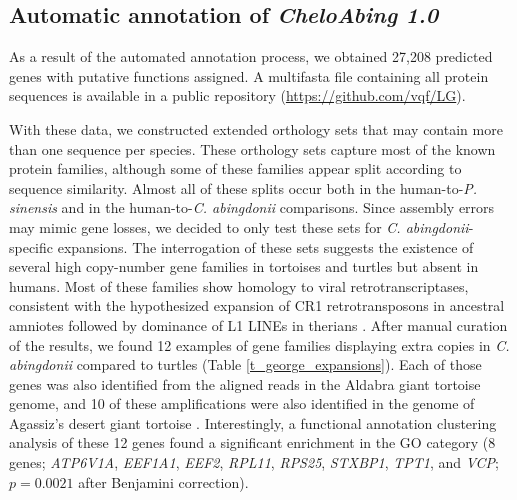 \subsection{Automatic annotation of \emph{CheloAbing 1.0}} \label{ss_results_george_automatic_annotation}

As a result of the automated annotation process, we obtained 27,208 predicted genes with putative functions assigned. 
A multifasta file containing all protein sequences is available in a public repository (\href{https://github.com/vqf/LG}{https://github.com/vqf/LG}).

With these data, we constructed extended orthology sets that may contain more than one sequence per species.
These orthology sets capture most of the known protein families, although some of these families appear split according to sequence similarity.
Almost all of these splits occur both in the human-to-\textit{P. sinensis} and in the {human-to-\textit{C. abingdonii}} comparisons.
Since assembly errors may mimic gene losses, we decided to only test these sets for {\textit{C. abingdonii}-specific} expansions.
The interrogation of these sets suggests the existence of several high copy-number gene families in tortoises and turtles but absent in humans.
Most of these families show homology to viral retrotranscriptases, consistent with the hypothesized expansion of CR1 retrotransposons in ancestral amniotes followed by dominance of L1 LINEs in therians \cite{Suh2014}.
After manual curation of the results, we found 12 examples of gene families displaying extra copies in \textit{C. abingdonii} compared to turtles (Table \ref{t_george_expansions}).
Each of those genes was also identified from the aligned reads in the Aldabra giant tortoise genome, and 10 of these amplifications were also identified in the genome of Agassiz’s desert giant tortoise \cite{Tollis2017}.
Interestingly, a functional annotation clustering analysis of these 12 genes found a significant enrichment in the  GO category (8 genes; \textit{ATP6V1A}, \textit{EEF1A1}, \textit{EEF2}, \textit{RPL11}, \textit{RPS25}, \textit{STXBP1}, \textit{TPT1}, and \textit{VCP}; $p=0.0021$ after Benjamini correction).

